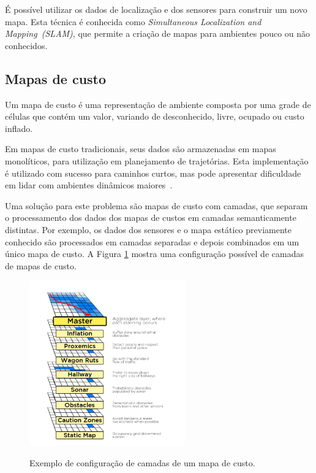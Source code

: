 \documentclass[repeatfields,xlists,xpacks,oneside,yearsonly]{ufrgscca}
\begin{document}
É possível utilizar os dados de localização e dos sensores para construir um novo mapa.
Esta técnica é conhecida como \textit{Simultaneous Localization and Mapping~(SLAM)},
que permite a criação de mapas para ambientes pouco ou não conhecidos.

\subsection{Mapas de custo}

Um mapa de custo é uma representação de ambiente composta por uma
grade de células que contém um valor, variando de desconhecido, livre,
ocupado ou custo inflado.

Em mapas de custo tradicionais, seus dados são armazenadas em mapas monolíticos,
para utilização em planejamento de trajetórias.
Esta implementação é utilizado com sucesso para caminhos curtos,
mas pode apresentar dificuldade em lidar com ambientes dinâmicos
maiores~\cite{layered_costmaps}.

Uma solução para este problema são mapas de custo com camadas,
que separam o processamento dos dados dos mapas de custos em camadas semanticamente distintas.
Por exemplo, os dados dos sensores e o mapa estático previamente conhecido são processados
em camadas separadas e depois combinados em um único mapa de custo.
A Figura \ref{fig:mapa_camadas} mostra uma configuração possível de camadas
de mapas de custo.

\begin{figure}[htbp]
    {
        \centering
        \caption{Exemplo de configuração de camadas de um mapa de custo.}
        \label{fig:mapa_camadas}
        \includegraphics[width=0.6\textwidth]{mapa_camadas.png}\\
    }
    {}
\end{figure}
\end{document}
